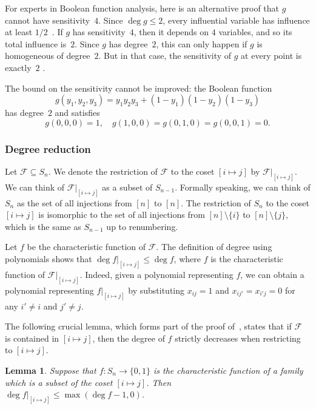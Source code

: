 \documentclass{article}
\newtheorem{lemma}[theorem]{Lemma}
\theoremstyle{definition}
\providecommand{\coset}[2]{[#1 \mapsto #2]}
\begin{document}
For experts in Boolean function analysis, here is an alternative proof that $g$ cannot have sensitivity~$4$. Since $\deg g \leq 2$, every influential variable has influence at least $1/2$~\cite[Proposition 3.6]{ODonnell}. If $g$ has sensitivity~$4$, then it depends on $4$ variables, and so its total influence is~$2$. Since $g$ has degree~$2$, this can only happen if $g$ is homogeneous of degree~$2$. But in that case, the sensitivity of $g$ at every point is exactly~$2$ \cite[Proposition 3.7]{FHKL}.

The bound on the sensitivity cannot be improved: the Boolean function
\[
 g(y_1,y_2,y_3) = y_1 y_2 y_3 + (1 - y_1) (1 - y_2) (1 - y_3)
\]
has degree~$2$ and satisfies
\[
 g(0,0,0) = 1, \quad
 g(1,0,0) = g(0,1,0) = g(0,0,1) = 0.
\]

\subsubsection{Degree reduction} \label{sec:degree-reduction-sym}

Let $\mathcal{F} \subseteq S_n$. We denote the restriction of $\mathcal{F}$ to the coset $\coset{i}{j}$ by $\mathcal{F}|_{\coset{i}{j}}$. We can think of $\mathcal{F}|_{\coset{i}{j}}$ as a subset of $S_{n-1}$. Formally speaking, we can think of $S_n$ as the set of all injections from $[n]$ to $[n]$. The restriction of $S_n$ to the coset $\coset{i}{j}$ is isomorphic to the set of all injections from $[n] \setminus \{i\}$ to $[n] \setminus \{j\}$, which is the same as $S_{n-1}$ up to renumbering.

Let $f$ be the characteristic function of $\mathcal{F}$. The definition of degree using polynomials shows that $\deg f|_{\coset{i}{j}} \leq \deg f$, where $f$ is the characteristic function of $\mathcal{F}|_{\coset{i}{j}}$. Indeed, given a polynomial representing $f$, we can obtain a polynomial representing $f|_{\coset{i}{j}}$ by substituting $x_{ij} = 1$ and $x_{ij'} = x_{i'j} = 0$ for any $i' \neq i$ and $j' \neq j$.

The following crucial lemma, which forms part of the proof of~\cite[Lemma 5.7]{DFLLV}, states that if $\mathcal{F}$ is contained in $\coset{i}{j}$, then the degree of $f$ strictly decreases when restricting to $\coset{i}{j}$.

\begin{lemma} \label{lem:degree-reduction-sym}
Suppose that $f\colon S_n \to \{0,1\}$ is the characteristic function of a family which is a subset of the coset $\coset{i}{j}$. Then $\deg f|_{\coset{i}{j}} \leq \max( \deg f - 1, 0 )$.
\end{lemma}
\end{document}
